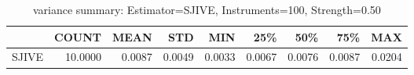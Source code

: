 \begin{table}[ht]
\centering
\caption{variance summary: Estimator=SJIVE, Instruments=100, Strength=0.50}
\begin{tabular}{lrrrrrrrr}
\toprule
 & COUNT & MEAN & STD & MIN & 25\% & 50\% & 75\% & MAX \\
\midrule
SJIVE & 10.0000 & 0.0087 & 0.0049 & 0.0033 & 0.0067 & 0.0076 & 0.0087 & 0.0204 \\
\bottomrule
\end{tabular}
\end{table}
